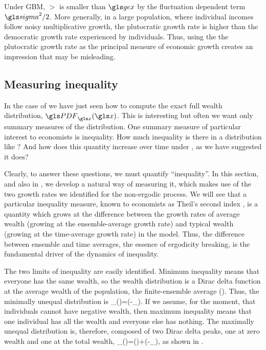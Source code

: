 Under GBM, $\gt$ is smaller than $\gex$ by the fluctuation dependent term $\gsigma^2/2$. More generally, in a large population, where individual incomes follow noisy multiplicative growth, the plutocratic growth rate is higher than the democratic growth rate experienced by individuals. Thus, using the the plutocratic growth rate as the principal measure of economic growth creates an impression that may be misleading.


\subsection{Measuring inequality}
In the case of \GBM we have just seen how to 
compute the exact full wealth distribution, $\PDF_\x(\x)$. This is interesting but often we want only summary measures of the distribution. One summary measure of particular interest to economists is inequality. How much inequality is there in a distribution like ? And how does this quantity increase over time under \GBM, as we have suggested it does?

Clearly, to answer these questions, we must quantify ``inequality''. In this section, and also in \cite{AdamouPeters2016}, we develop a natural way of measuring it, which makes use of the two growth rates we identified for the non-ergodic process. We will see that a particular inequality measure, known to economists as Theil's second index \cite{Theil1967}, is a quantity which grows at the difference between the growth rates of average wealth (growing at the ensemble-average growth rate) and typical wealth (growing at the time-average growth rate) in the \GBM model. Thus, the difference between ensemble and time averages, the essence of ergodicity breaking, is the fundamental driver of the dynamics of inequality.

The two limits of inequality are easily identified. Minimum inequality means that everyone 
has the same wealth, so the wealth distribution is a Dirac delta function at the average wealth of the population, \ie the finite-ensemble average (\FEA). Thus, the minimally unequal distribution is
\be
\PDF_\x(\x)=\delta(\x-\ave{\x}_\N).
\ee
If we assume, for the moment, that individuals cannot have negative wealth, then maximum inequality means that one individual has all the wealth and everyone else has nothing.
The maximally unequal distribution is, therefore, composed of two Dirac delta peaks, one at zero wealth and one at the total wealth,
\be 
\PDF_\x(\x)=\delta()+\delta(\x-\N\ave{\x}_\N),
\ee
as shown in .

